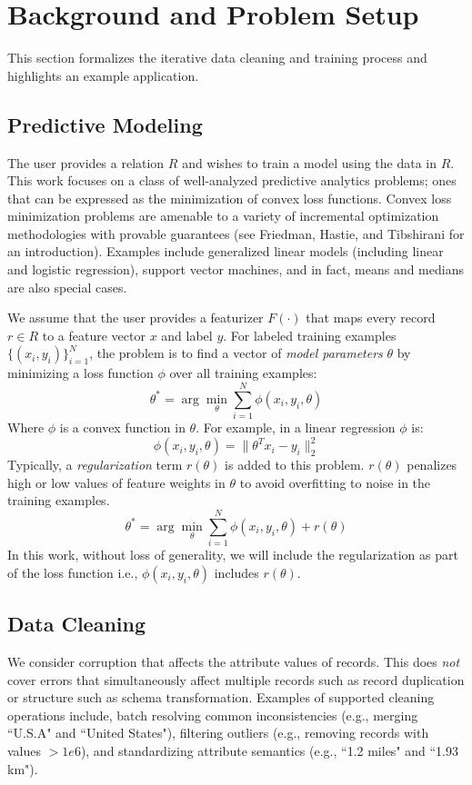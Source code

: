 \section{Background and Problem Setup}\label{background}
This section formalizes the iterative data cleaning and training process and highlights an example application.

\subsection{Predictive Modeling}
The user provides a relation $R$ and wishes to train a model using the data in $R$.
This work focuses on a class of well-analyzed predictive analytics problems; ones that can be expressed as the minimization of convex loss functions.
Convex loss minimization problems are amenable to a variety of incremental optimization methodologies with provable guarantees (see Friedman, Hastie, and Tibshirani \cite{friedman2001elements} for an introduction).
Examples include generalized linear models (including linear and logistic regression), support vector machines, and in fact, means and medians are also special cases. 

We assume that the user provides a featurizer $F(\cdot)$ that maps every record $r \in R$ to a feature vector $x$ and label $y$.
For labeled training examples $\{(x_{i},y_{i})\}_{i=1}^{N}$, the problem is to find a vector of \emph{model parameters} $\theta$ by minimizing a loss function $\phi$ over all training examples:
\[
 \theta^{*}=\arg\min_{\theta}\sum_{i=1}^{N}\phi(x_{i},y_{i},\theta)
\]
Where $\phi$ is a convex function in $\theta$.
For example, in a linear regression $\phi$ is:
\[
\phi(x_{i},y_{i},\theta) = \|\theta^Tx_{i} - y_i \|_2^2
\]
Typically, a \emph{regularization} term $r(\theta)$ is added to this problem.
$r(\theta)$ penalizes high or low values of feature weights in $\theta$ to avoid overfitting to noise in the training examples.
\begin{equation}
 \theta^{*}=\arg\min_{\theta}\sum_{i=1}^{N}\phi(x_{i},y_{i},\theta) + r(\theta)
 \label{ideal}
\end{equation}
In this work, without loss of generality, we will include the regularization as part of the loss function i.e., $\phi(x_{i},y_{i},\theta)$ includes $r(\theta)$.

\subsection{Data Cleaning}
We consider corruption that affects the attribute values of records. This does \emph{not} cover errors that simultaneously affect multiple records such as record duplication or structure such as schema transformation.
Examples of supported cleaning operations include, batch resolving common inconsistencies (e.g., merging ``U.S.A" and ``United States"), filtering outliers (e.g., removing records with values $>1e6$), and standardizing attribute semantics (e.g., ``1.2 miles" and ``1.93 km").

